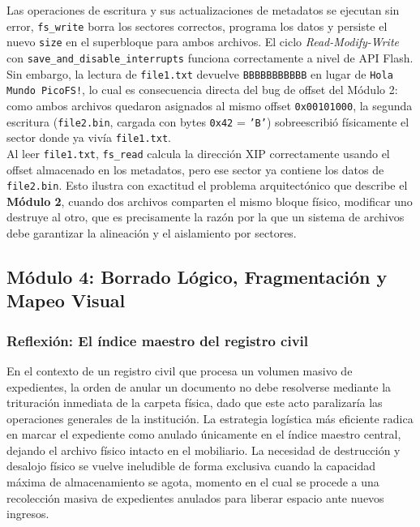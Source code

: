 \documentclass[12pt,letterpaper]{article}
\begin{document}
Las operaciones de escritura y sus actualizaciones de metadatos se ejecutan sin error, \texttt{fs\_write} borra
los sectores correctos, programa los datos y persiste el nuevo \texttt{size} en el superbloque para ambos
archivos. El ciclo \textit{Read-Modify-Write} con \texttt{save\_and\_disable\_interrupts} funciona correctamente
a nivel de API Flash.\\

Sin embargo, la lectura de \texttt{file1.txt} devuelve \texttt{BBBBBBBBBBB} en lugar de
\texttt{Hola Mundo PicoFS!}, lo cual es consecuencia directa del bug de offset del Módulo 2: como ambos archivos
quedaron asignados al mismo offset \texttt{0x00101000}, la segunda escritura (\texttt{file2.bin}, cargada con
bytes \texttt{0x42} = \texttt{'B'}) sobreescribió físicamente el sector donde ya vivía \texttt{file1.txt}.\\
Al leer \texttt{file1.txt}, \texttt{fs\_read} calcula la dirección XIP correctamente usando el offset almacenado
en los metadatos, pero ese sector ya contiene los datos de \texttt{file2.bin}. Esto ilustra con exactitud el
problema arquitectónico que describe el \textbf{Módulo 2}, cuando dos archivos comparten el mismo bloque físico,
modificar uno destruye al otro, que es precisamente la razón por la que un sistema de archivos debe garantizar la
alineación y el aislamiento por sectores.

\subsection*{Módulo 4: Borrado Lógico, Fragmentación y Mapeo Visual}

\subsubsection*{Reflexión: El índice maestro del registro civil}
En el contexto de un registro civil que procesa un volumen masivo de expedientes, la orden de anular un
documento no debe resolverse mediante la trituración inmediata de la carpeta física, dado que este acto
paralizaría las operaciones generales de la institución. La estrategia logística más eficiente radica en marcar
el expediente como anulado únicamente en el índice maestro central, dejando el archivo físico intacto en el
mobiliario. La necesidad de destrucción y desalojo físico se vuelve ineludible de forma exclusiva cuando la
capacidad máxima de almacenamiento se agota, momento en el cual se procede a una recolección masiva de
expedientes anulados para liberar espacio ante nuevos ingresos.
\end{document}
